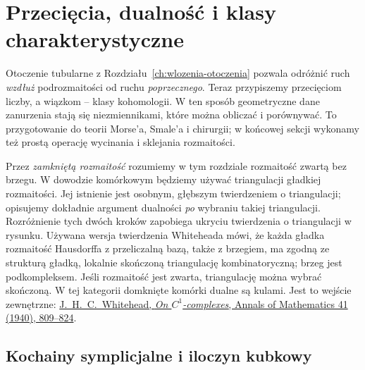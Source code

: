 \chapter{Przecięcia, dualność i klasy charakterystyczne}
\label{ch:przeciecia-dualnosc-klasy}

Otoczenie tubularne z Rozdziału~\ref{ch:wlozenia-otoczenia}
pozwala odróżnić ruch \emph{wzdłuż} podrozmaitości
od ruchu \emph{poprzecznego}. Teraz przypiszemy
przecięciom liczby, a wiązkom -- klasy kohomologii.
W ten sposób geometryczne dane zanurzenia stają się
niezmiennikami, które można obliczać i porównywać.
To przygotowanie do teorii Morse'a, Smale'a i chirurgii;
w końcowej sekcji wykonamy też prostą operację
wycinania i sklejania rozmaitości.

Przez \emph{zamkniętą rozmaitość} rozumiemy w tym
rozdziale rozmaitość zwartą bez brzegu. W dowodzie
komórkowym będziemy używać triangulacji gładkiej
rozmaitości. Jej istnienie jest osobnym, głębszym
twierdzeniem o triangulacji; opisujemy dokładnie
argument dualności \emph{po} wybraniu takiej
triangulacji. Rozróżnienie tych dwóch kroków
zapobiega ukryciu twierdzenia o triangulacji
w rysunku. Używana wersja twierdzenia Whiteheada mówi,
że każda gładka rozmaitość Hausdorffa z przeliczalną bazą,
także z brzegiem, ma zgodną ze strukturą gładką, lokalnie
skończoną triangulację kombinatoryczną; brzeg jest podkompleksem.
Jeśli rozmaitość jest zwarta, triangulację można wybrać skończoną.
W tej kategorii domknięte komórki dualne są kulami.
Jest to wejście zewnętrzne:
\href{https://doi.org/10.2307/1968861}{J.\ H.\ C.\ Whitehead,
\emph{On $C^1$-complexes}, Annals of Mathematics 41 (1940), 809--824}.

\section{Kochainy symplicjalne i iloczyn kubkowy}
\label{sec:kubek-16}

